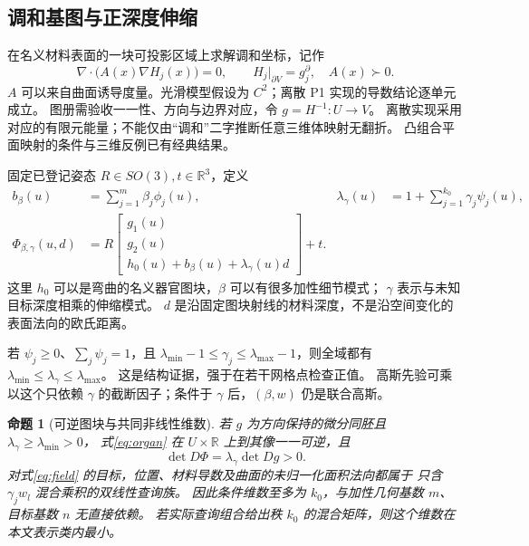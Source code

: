 \documentclass[11pt,a4paper]{article}
\numberwithin{equation}{section}
\newtheorem{proposition}[theorem]{命题}
\theoremstyle{definition}
\newcommand{\R}{\mathbb R}
\begin{document}
\subsection{调和基图与正深度伸缩}
在名义材料表面的一块可投影区域上求解调和坐标，记作
\begin{equation}
 \nabla\!\cdot\!\bigl(A(x)\nabla H_j(x)\bigr)=0,
 \qquad H_j|_{\partial V}=g_j^{\partial},\quad A(x)\succ0 .
 \label{eq:harmonic}
\end{equation}
\(A\) 可以来自曲面诱导度量。光滑模型假设为 \(C^2\)；离散 P1 实现的导数结论逐单元成立。
图册需验收一一性、方向与边界对应，令 \(g=H^{-1}:U\to V\)。
离散实现采用对应的有限元能量；不能仅由“调和”二字推断任意三维体映射无翻折。
凸组合平面映射的条件与三维反例已有经典结果\cite{floater2003,floater2006}。

固定已登记姿态 \(R\in SO(3),t\in\R^3\)，定义
\begin{align}
 b_\beta(u)&=\sum_{j=1}^{m}\beta_j\phi_j(u),&
 \lambda_\gamma(u)&=1+\sum_{j=1}^{k_0}\gamma_j\psi_j(u),\\
 \Phi_{\beta,\gamma}(u,d)
 &=R\begin{bmatrix}g_1(u)\\g_2(u)\\h_0(u)+b_\beta(u)+\lambda_\gamma(u)d\end{bmatrix}+t .
 \label{eq:organ}
\end{align}
这里 \(h_0\) 可以是弯曲的名义器官图块，\(\beta\) 可以有很多加性细节模式；
\(\gamma\) 表示与未知目标深度相乘的伸缩模式。
\(d\) 是沿固定图块射线的材料深度，不是沿空间变化的表面法向的欧氏距离。

若 \(\psi_j\ge0\)、\(\sum_j\psi_j=1\)，且
\(\lambda_{\min}-1\le\gamma_j\le\lambda_{\max}-1\)，则全域都有
\(\lambda_{\min}\le\lambda_\gamma\le\lambda_{\max}\)。
这是结构证据，强于在若干网格点检查正值。
高斯先验可乘以这个只依赖 \(\gamma\) 的截断因子；条件于 \(\gamma\) 后，\((\beta,w)\) 仍是联合高斯。

\begin{proposition}[可逆图块与共同非线性维数]
\label{prop:organ}
若 \(g\) 为方向保持的微分同胚且 \(\lambda_\gamma\ge\lambda_{\min}>0\)，
式\eqref{eq:organ} 在 \(U\times\R\) 上到其像一一可逆，且
\begin{equation}
 \det D\Phi=\lambda_\gamma\det Dg>0 .
\end{equation}
对式\eqref{eq:field} 的目标，位置、材料导数及曲面的未归一化面积法向都属于
只含 \(\gamma_jw_l\) 混合乘积的双线性查询族。
因此条件维数至多为 \(k_0\)，与加性几何基数 \(m\)、目标基数 \(n\) 无直接依赖。
若实际查询组合给出秩 \(k_0\) 的混合矩阵，则这个维数在本文表示类内最小。
\end{proposition}
\end{document}
